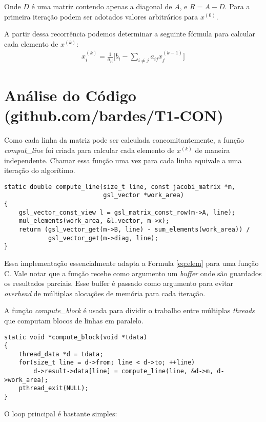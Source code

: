 \documentclass[11pt,towside]{article}
\begin{document}
Onde $D$ é uma matriz contendo apenas a diagonal de $A$, e $R = A - D$. Para a primeira iteração podem ser adotados valores arbitrários para $x^{(0)}$.

A partir dessa recorrência podemos determinar a seguinte fórmula para calcular cada elemento de $x^{(k)}$:
\begin{align}
\label{eq:elem}
x^{(k)}_i = \frac{1}{a_{ii}}\bigg[b_i - \sum_{i\neq j}a_{ij}x^{(k-1)}_j\bigg]
\end{align}

\section{Análise do Código (github.com/bardes/T1-CON)}

Como cada linha da matriz pode ser calculada concomitantemente, a função \emph{comput\_line} foi criada para calcular cada elemento de $x^{(k)}$ de maneira independente. Chamar essa função uma vez para cada linha equivale a uma iteração do algorítimo.

\begin{lstlisting}
static double compute_line(size_t line, const jacobi_matrix *m,
                           gsl_vector *work_area)
{
    gsl_vector_const_view l = gsl_matrix_const_row(m->A, line);
    mul_elements(work_area, &l.vector, m->x);
    return (gsl_vector_get(m->B, line) - sum_elements(work_area)) /
            gsl_vector_get(m->diag, line);
}
\end{lstlisting}

Essa implementação essencialmente adapta a Formula \ref{eq:elem} para uma função C. Vale notar que a função recebe como argumento um \emph{buffer} onde são guardados os resultados parciais. Esse buffer é passado como argumento para evitar \emph{overhead} de múltiplas alocações de memória para cada iteração.

A função \emph{compute\_block} é usada para dividir o trabalho entre múltiplas \emph{threads} que computam blocos de linhas em paralelo.

\begin{lstlisting}
static void *compute_block(void *tdata)
{
    thread_data *d = tdata;
    for(size_t line = d->from; line < d->to; ++line)
        d->result->data[line] = compute_line(line, &d->m, d->work_area);
    pthread_exit(NULL);
}
\end{lstlisting}

O loop principal é bastante simples:
\end{document}
